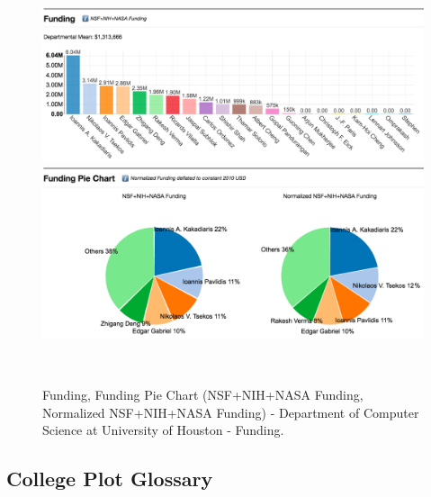 \begin{figure}
  \centering
  \includegraphics[width=1\textwidth]{figures/Dept-Fund-HD}
  \includegraphics[width=1\textwidth]{figures/Dept-Fund-HD2}
  \caption{Funding, Funding Pie Chart (NSF+NIH+NASA Funding, Normalized NSF+NIH+NASA Funding) - Department of Computer Science at University of Houston - Funding.}~\label{fig:DP-College1}
\end{figure}






\subsection{College Plot Glossary}



